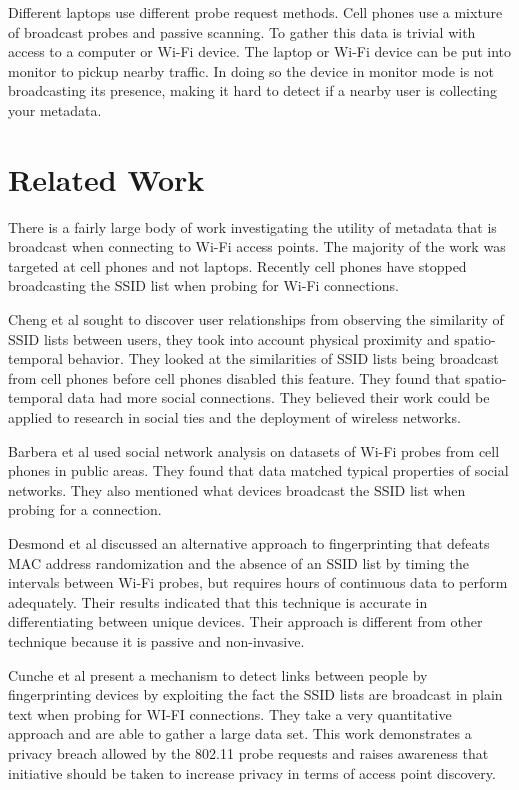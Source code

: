 \documentclass[letterpaper,twocolumn,10pt]{article}
\begin{document}
Different laptops use different probe request methods. Cell phones use a mixture of broadcast probes and passive scanning. To gather this data is trivial with access to a computer or Wi-Fi device. The laptop or Wi-Fi device can be put into monitor to pickup nearby traffic. In doing so the device in monitor mode is not broadcasting its presence, making it hard to detect if a nearby user is collecting your metadata.

\section{Related Work}
There is a fairly large body of work investigating the utility of metadata that is broadcast when connecting to Wi-Fi access points. The majority of the work was targeted at cell phones and not laptops. Recently cell phones have stopped broadcasting the SSID list when probing for Wi-Fi connections.

Cheng et al \cite{cheng} sought to discover user relationships from observing the similarity of SSID lists between users, they took into account physical proximity and spatio-temporal behavior. They looked at the similarities of SSID lists being broadcast from cell phones before cell phones disabled this feature. They found that spatio-temporal data had more social connections. They believed their work could be applied to research in social ties and the deployment of wireless networks.

Barbera et al \cite{barbera} used social network analysis on datasets of Wi-Fi probes from cell phones in public areas. They found that data matched typical properties of social networks. They also mentioned what devices broadcast the SSID list when probing for a connection.

Desmond et al \cite{desmond} discussed an alternative approach to fingerprinting that defeats MAC address 
randomization and the absence of an SSID list by timing the intervals between Wi-Fi probes, but requires hours of continuous data to perform adequately. Their results indicated that this technique is accurate in differentiating between unique devices. Their approach is different from other technique because it is passive and non-invasive.

Cunche et al \cite{cunche}  present a mechanism to detect links between people by fingerprinting devices by exploiting the fact the SSID lists are broadcast in plain text when probing for WI-FI connections. They take a very quantitative approach and are able to gather a large data set. This work demonstrates a privacy breach allowed by the 802.11 probe requests and raises awareness that initiative should be taken to increase privacy in terms of access point discovery. 
\end{document}
